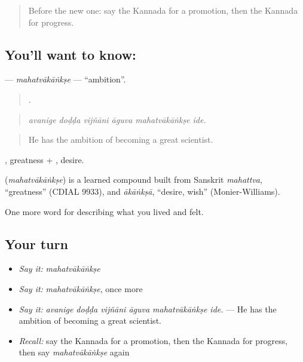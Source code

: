 \label{lesson:KA-C517-mahatvakankse}



\begin{quote}
Before the new one: say the Kannada for a promotion, then the Kannada for progress.
\end{quote}

\subsection*{You'll want to know: }
\textbf{} — \emph{mahatvākāṅkṣe} — \textquotedblleft{}ambition\textquotedblright{}.

\begin{quote}
     .
\end{quote}

\begin{quote}
\emph{avanige doḍḍa vijñāni āguva mahatvākāṅkṣe ide.}
\end{quote}

\begin{quote}
He has the ambition of becoming a great scientist.
\end{quote}

, greatness + , desire.

\begin{cousinweb}
\textbf{} (\emph{mahatvākāṅkṣe}) is a learned compound built from Sanskrit \emph{mahattva}, \textquotedblleft{}greatness\textquotedblright{} (CDIAL 9933), and \emph{ākāṅkṣā}, \textquotedblleft{}desire, wish\textquotedblright{} (Monier-Williams).
\end{cousinweb}

\begin{grammarlens}[title={What you've built}]
One more word for describing what you lived and felt.
\end{grammarlens}

\subsection*{Your turn}
\begin{itemize}
\raggedright
  \item \emph{Say it:} \emph{mahatvākāṅkṣe}
  \item \emph{Say it:} \emph{mahatvākāṅkṣe}, once more
  \item \emph{Say it:} \emph{avanige doḍḍa vijñāni āguva mahatvākāṅkṣe ide.} — He has the ambition of becoming a great scientist.
  \item \emph{Recall:} say the Kannada for a promotion, then the Kannada for progress, then say \emph{mahatvākāṅkṣe} again
\end{itemize}

